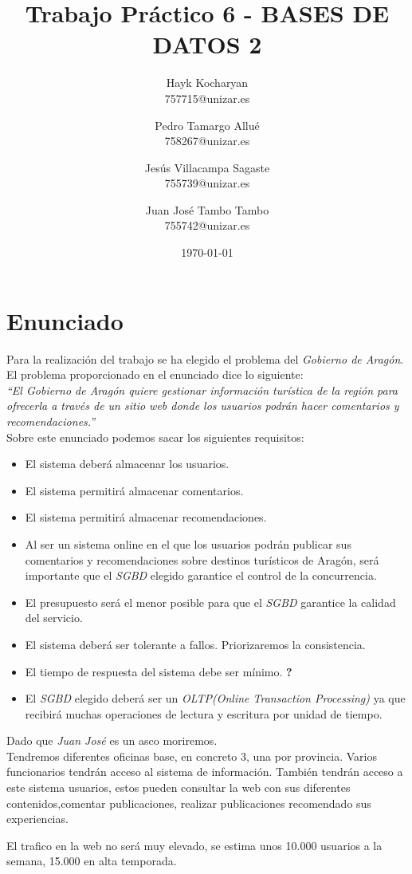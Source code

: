 \documentclass{article}
\title{Trabajo Práctico 6 - BASES DE DATOS 2}
\author{
  Hayk Kocharyan\\
  757715@unizar.es
  \and
  Pedro Tamargo Allué\\
  758267@unizar.es
  \and
  Jesús Villacampa Sagaste\\
  755739@unizar.es
  \and
  Juan José Tambo Tambo\\
  755742@unizar.es
}
\date{\today}
\begin{document}
\maketitle

%
\tableofcontents

\newpage 

\section{Enunciado}
Para la realización del trabajo se ha elegido el problema del \emph{Gobierno de Aragón}. El problema proporcionado en el enunciado dice lo siguiente:\\

\emph{``El Gobierno de Aragón quiere gestionar información turística de la región para ofrecerla a través de un sitio web donde los usuarios podrán hacer comentarios y recomendaciones.''}
\\

Sobre este enunciado podemos sacar los siguientes requisitos:
\begin{itemize}
\item El sistema deberá almacenar los usuarios.
\item El sistema permitirá almacenar comentarios.
\item El sistema permitirá almacenar recomendaciones.
\item Al ser un sistema online en el que los usuarios podrán publicar sus comentarios y recomendaciones sobre destinos turísticos de Aragón, será importante que el \emph{SGBD} elegido garantice el control de la concurrencia.
\item El presupuesto será el menor posible para que el \emph{SGBD} garantice la calidad del servicio.
\item El sistema deberá ser tolerante a fallos. Priorizaremos la consistencia.
\item El tiempo de respuesta del sistema debe ser mínimo. \textbf{?}
\item El \emph{SGBD} elegido deberá ser un \emph{OLTP(Online Transaction Processing)} ya que recibirá muchas operaciones de lectura y escritura por unidad de tiempo.
\end{itemize}

Dado que \emph{Juan José} es un asco moriremos.\\

Tendremos diferentes oficinas base, en concreto 3, una por provincia. Varios funcionarios tendrán acceso al sistema de información. También tendrán acceso a este sistema usuarios, estos pueden consultar la web con sus diferentes contenidos,comentar publicaciones, realizar publicaciones recomendado sus experiencias.

El trafico en la web no será muy elevado, se estima unos 10.000 usuarios a la semana, 15.000 en alta temporada.
\end{document}
